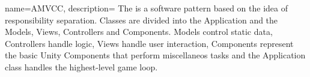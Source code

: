 
{
	name={AMVCC},
		description={
			The  is a software pattern based on the idea of responsibility separation.
			Classes are divided into the Application and the Models, Views, Controllers and Components. Models control static data, Controllers handle logic, Views handle user interaction, Components represent the basic Unity Components that perform miscellaneos tasks and the Application class handles the highest-level game loop.
		}
}


